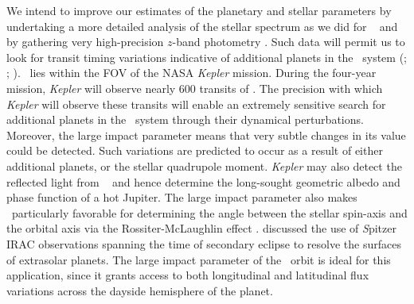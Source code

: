 We intend to improve our estimates of the planetary and stellar
parameters by undertaking a more detailed analysis of the stellar
spectrum as we did for \tresOne\
\citep{Sozzetti_Yong_Torres:apjl:2004a} and by gathering very
high-precision $z$-band photometry
\citep[e.g.,][]{Holman_Winn_Latham:apj:2006a}.  Such data will
permit us to look for transit timing variations indicative of
additional planets in the \tresTwo\ system
(\citealp{Agol_Steffen_Sari:mnras:2005a}; \citealp{Holman_Murray:Science:2005a}; \citealp{Steffen_Agol:mnras:2005a}). \tresTwo\ lies within the FOV of the NASA
\textit{Kepler} mission. During the four-year mission,
\textit{Kepler} will observe nearly 600 transits of \tresTwo.
The precision with which \textit{Kepler} will observe these transits will
enable an extremely sensitive search for additional planets in the \tresTwo\
system through their dynamical perturbations.  Moreover, the large impact
parameter means that very subtle changes in its value could be detected.
Such variations are predicted \citep{Miralda-Escude:apj:2002a} to occur as a result
of either additional planets, or the stellar quadrupole moment. \textit{Kepler}
may also detect the reflected light from \tresTwo\ \citep{Jenkins_Doyle:apj:2003a}
and hence determine the long-sought geometric albedo and phase function of
a hot Jupiter.
The large impact parameter also makes \tresTwo\ particularly
favorable for determining the angle between the stellar spin-axis and the
orbital axis via the Rossiter-McLaughlin effect
\citep{Gaudi_Winn:apj:2007a}.
\citet{Williams_Charbonneau_Cooper:apj:2006a} discussed
the use of {\textit Spitzer} IRAC observations spanning the time of
secondary eclipse to resolve the surfaces of extrasolar planets.  The
large impact parameter of the \tresTwo\ orbit is ideal for this
application, since it grants access to both longitudinal and
latitudinal flux variations across the dayside hemisphere of the
planet.%
